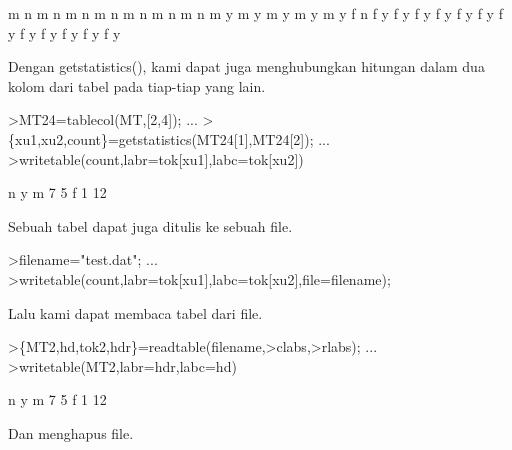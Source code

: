 \documentclass[a4paper,10pt]{article}
\begin{document}
\begin{eulernotebook}
\begin{eulerprompt}
\end{eulerprompt}
\begin{euleroutput}
           m         n
           m         n
           m         n
           m         n
           m         n
           m         n
           m         n
           m         y
           m         y
           m         y
           m         y
           m         y
           f         n
           f         y
           f         y
           f         y
           f         y
           f         y
           f         y
           f         y
           f         y
           f         y
           f         y
           f         y
           f         y
\end{euleroutput}
\begin{eulercomment}
Dengan getstatistics(), kami dapat juga menghubungkan hitungan dalam dua kolom dari tabel
pada tiap-tiap yang lain.
\end{eulercomment}
\begin{eulerprompt}
>MT24=tablecol(MT,[2,4]); ...
>\{xu1,xu2,count\}=getstatistics(MT24[1],MT24[2]); ...
>writetable(count,labr=tok[xu1],labc=tok[xu2])
\end{eulerprompt}
\begin{euleroutput}
                     n         y
           m         7         5
           f         1        12
\end{euleroutput}
\begin{eulercomment}
Sebuah tabel dapat juga ditulis ke sebuah file.
\end{eulercomment}
\begin{eulerprompt}
>filename="test.dat"; ...
>writetable(count,labr=tok[xu1],labc=tok[xu2],file=filename);
\end{eulerprompt}
\begin{eulercomment}
Lalu kami dapat membaca tabel dari file.
\end{eulercomment}
\begin{eulerprompt}
>\{MT2,hd,tok2,hdr\}=readtable(filename,>clabs,>rlabs); ...
>writetable(MT2,labr=hdr,labc=hd)
\end{eulerprompt}
\begin{euleroutput}
                     n         y
           m         7         5
           f         1        12
\end{euleroutput}
\begin{eulercomment}
Dan menghapus file.
\end{eulercomment}
\begin{eulerprompt}

\end{eulerprompt}
\end{eulernotebook}
\end{document}
